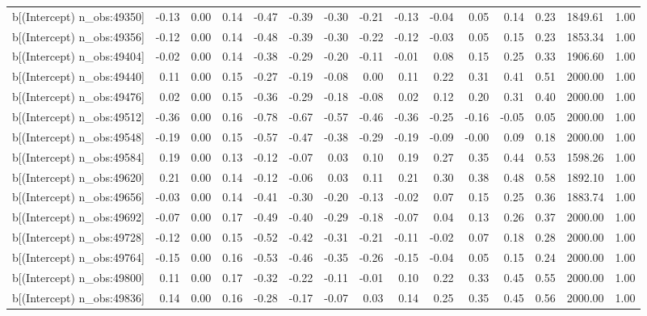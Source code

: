 \begin{table}[ht]
\begin{tabular}{rrrrrrrrrrrrrrr}
  b[(Intercept) n\_obs:49350] & -0.13 & 0.00 & 0.14 & -0.47 & -0.39 & -0.30 & -0.21 & -0.13 & -0.04 & 0.05 & 0.14 & 0.23 & 1849.61 & 1.00 \\ 
  b[(Intercept) n\_obs:49356] & -0.12 & 0.00 & 0.14 & -0.48 & -0.39 & -0.30 & -0.22 & -0.12 & -0.03 & 0.05 & 0.15 & 0.23 & 1853.34 & 1.00 \\ 
  b[(Intercept) n\_obs:49404] & -0.02 & 0.00 & 0.14 & -0.38 & -0.29 & -0.20 & -0.11 & -0.01 & 0.08 & 0.15 & 0.25 & 0.33 & 1906.60 & 1.00 \\ 
  b[(Intercept) n\_obs:49440] & 0.11 & 0.00 & 0.15 & -0.27 & -0.19 & -0.08 & 0.00 & 0.11 & 0.22 & 0.31 & 0.41 & 0.51 & 2000.00 & 1.00 \\ 
  b[(Intercept) n\_obs:49476] & 0.02 & 0.00 & 0.15 & -0.36 & -0.29 & -0.18 & -0.08 & 0.02 & 0.12 & 0.20 & 0.31 & 0.40 & 2000.00 & 1.00 \\ 
  b[(Intercept) n\_obs:49512] & -0.36 & 0.00 & 0.16 & -0.78 & -0.67 & -0.57 & -0.46 & -0.36 & -0.25 & -0.16 & -0.05 & 0.05 & 2000.00 & 1.00 \\ 
  b[(Intercept) n\_obs:49548] & -0.19 & 0.00 & 0.15 & -0.57 & -0.47 & -0.38 & -0.29 & -0.19 & -0.09 & -0.00 & 0.09 & 0.18 & 2000.00 & 1.00 \\ 
  b[(Intercept) n\_obs:49584] & 0.19 & 0.00 & 0.13 & -0.12 & -0.07 & 0.03 & 0.10 & 0.19 & 0.27 & 0.35 & 0.44 & 0.53 & 1598.26 & 1.00 \\ 
  b[(Intercept) n\_obs:49620] & 0.21 & 0.00 & 0.14 & -0.12 & -0.06 & 0.03 & 0.11 & 0.21 & 0.30 & 0.38 & 0.48 & 0.58 & 1892.10 & 1.00 \\ 
  b[(Intercept) n\_obs:49656] & -0.03 & 0.00 & 0.14 & -0.41 & -0.30 & -0.20 & -0.13 & -0.02 & 0.07 & 0.15 & 0.25 & 0.36 & 1883.74 & 1.00 \\ 
  b[(Intercept) n\_obs:49692] & -0.07 & 0.00 & 0.17 & -0.49 & -0.40 & -0.29 & -0.18 & -0.07 & 0.04 & 0.13 & 0.26 & 0.37 & 2000.00 & 1.00 \\ 
  b[(Intercept) n\_obs:49728] & -0.12 & 0.00 & 0.15 & -0.52 & -0.42 & -0.31 & -0.21 & -0.11 & -0.02 & 0.07 & 0.18 & 0.28 & 2000.00 & 1.00 \\ 
  b[(Intercept) n\_obs:49764] & -0.15 & 0.00 & 0.16 & -0.53 & -0.46 & -0.35 & -0.26 & -0.15 & -0.04 & 0.05 & 0.15 & 0.24 & 2000.00 & 1.00 \\ 
  b[(Intercept) n\_obs:49800] & 0.11 & 0.00 & 0.17 & -0.32 & -0.22 & -0.11 & -0.01 & 0.10 & 0.22 & 0.33 & 0.45 & 0.55 & 2000.00 & 1.00 \\ 
  b[(Intercept) n\_obs:49836] & 0.14 & 0.00 & 0.16 & -0.28 & -0.17 & -0.07 & 0.03 & 0.14 & 0.25 & 0.35 & 0.45 & 0.56 & 2000.00 & 1.00 \\ 

\end{tabular}
\end{table}
